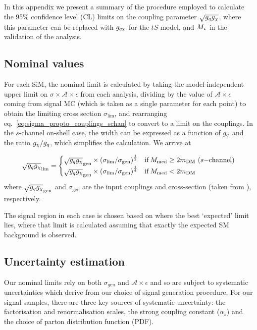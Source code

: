 In this appendix we present a summary of the procedure employed to calculate the 95\% confidence level (CL) limits on the coupling parameter $\sqrt{g_q g_{\chi}}$, where this parameter can be replaced with $g_{q \chi}$ for the $tS$ model, and $M_{\star}$ in the validation of the \monojet analysis.

\subsection{Nominal values}
For each SiM, the nominal limit is calculated by taking the model-independent upper limit on $\sigma \times \mathcal{A} \times \epsilon$ from each analysis, dividing by the value of $\mathcal{A} \times \epsilon$ coming from signal MC (which is taken as a single parameter for each point) to obtain the limiting cross section $\sigma_{\mathrm{lim}}$, and rearranging eq.~\ref{eq:sigma_propto_couplings_schan} to convert to a limit on the couplings. In the $s$-channel on-shell case, the width can be expressed as a function of $g_q$ and the ratio $g_{\chi} / g_q$, which simplifies the calculation. We arrive at

\begin{equation}
  \sqrt{g_q g_{\chi}}_{\mathrm{lim}} =
  \begin{cases}
      \sqrt{g_q g_{\chi}}_{\mathrm{gen}} \times \left( \sigma_{\mathrm{lim}} / \sigma_{\mathrm{gen}} \right)^{\frac{1}{2}} & \mathrm{ if } \, M_{\mathrm{med}} \geq 2 m_{\mathrm{DM}} \,\, (s\mathrm{-channel})\\
      \sqrt{g_q g_{\chi}}_{\mathrm{gen}} \times \left( \sigma_{\mathrm{lim}} / \sigma_{\mathrm{gen}} \right)^{\frac{1}{4}} & \mathrm{ if } \, M_{\mathrm{med}} < 2 m_{\mathrm{DM}} \\
  \end{cases}
  \label{eq:nominal_limit}
\end{equation}
where $\sqrt{g_q g_{\chi}}_{\mathrm{gen}}$ and $\sigma_{\mathrm{gen}}$ are the input couplings and cross-section (taken from \PYTHIAnospace), respectively.

The signal region in each case is chosen based on where the best `expected' limit lies, where that limit is calculated assuming that exactly the expected SM background is observed.

\subsection{Uncertainty estimation}
\label{uncertainty_estimation_proc}
Our nominal limits rely on both $\sigma_{gen}$ and $\mathcal{A}\times\epsilon$ and so are subject to systematic uncertainties which derive from our choice of signal generation procedure. For our signal samples, there are three key sources of systematic uncertainty: the factorisation and renormalisation scales, the strong coupling constant ($\alpha_{s}$) and the choice of parton distribution function (PDF).

